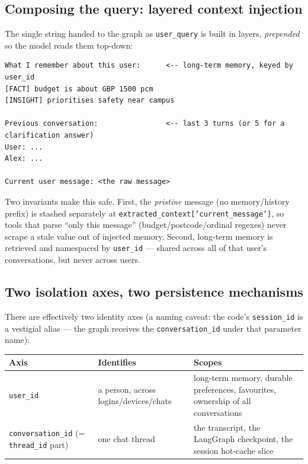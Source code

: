 \documentclass[11pt,a4paper]{article}
\newcommand{\code}[1]{\texttt{\small #1}}
\begin{document}
\subsection{Composing the query: layered context injection}
The single string handed to the graph as \code{user\_query} is built in layers,
\emph{prepended} so the model reads them top-down:

\begin{lstlisting}
What I remember about this user:      <-- long-term memory, keyed by user_id
[FACT] budget is about GBP 1500 pcm
[INSIGHT] prioritises safety near campus

Previous conversation:                <-- last 3 turns (or 5 for a clarification answer)
User: ...
Alex: ...

Current user message: <the raw message>
\end{lstlisting}

Two invariants make this safe. First, the \emph{pristine} message (no memory/history
prefix) is stashed separately at \code{extracted\_context['current\_message']}, so
tools that parse ``only this message'' (budget/postcode/ordinal regexes) never scrape
a stale value out of injected memory. Second, long-term memory is retrieved and
namespaced by \code{user\_id} --- shared across all of that user's conversations, but
never across users.

\subsection{Two isolation axes, two persistence mechanisms}
There are effectively two identity axes (a naming caveat: the code's
\code{session\_id} is a vestigial alias --- the graph receives the
\code{conversation\_id} under that parameter name):

\begin{center}
\begin{tabular}{@{}p{} p{} p{}@{}}
\toprule
\textbf{Axis} & \textbf{Identifies} & \textbf{Scopes}\\
\midrule
\code{user\_id} & a person, across logins/devices/chats & long-term memory, durable preferences, favourites, ownership of all conversations\\
\code{conversation\_id} (= \code{thread\_id} part) & one chat thread & the transcript, the LangGraph checkpoint, the session hot-cache slice\\
\bottomrule
\end{tabular}
\end{center}
\end{document}
